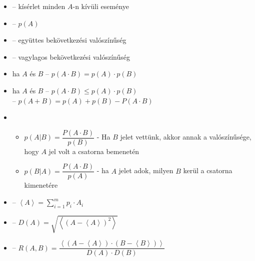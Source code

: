 \documentclass[main.tex]{subfiles}
\begin{document}
  \begin{itemize}
    \item {}
    – kísérlet minden $A$-n kívüli eseménye
    
    \item {}
    – $p(A)$
    
    \item {}
    – együttes bekövetkezési valószínűség
    
    \item {}
    – vagylagos bekövetkezési valószínűség
    
    \item ha $A$ és $B$ 
    – $p(A \cdot B) = p(A) \cdot p(B)$
    
    \item ha $A$ és $B$ 
    \tabto{3.8cm} – \tabto{4.4cm} $p(A \cdot B) \leq p(A) \cdot p(B)$ \\[1mm]
    \tabto{3.8cm} – \tabto{4.4cm} $p(A+B) = p(A) + p(B) - P(A \cdot B)$
    
    \item {}
    \begin{itemize}
      \item $p \left( A|B \right) = \dfrac{P(A \cdot B)}{p(B)}$
      \tabto{4cm} - \tabto{4.6cm}
      Ha $B$ jelet vettünk, akkor annak a valószínűsége,
      \\ \tabto{4.6cm}
      hogy $A$ jel volt a csatorna bemenetén
      \item $p \left( B|A \right) = \dfrac{P(A \cdot B)}{p(A)}$
      \tabto{4cm} - \tabto{4.6cm}
      ha $A$ jelet adok, milyen $B$ kerül a csatorna kimenetére
    \end{itemize}
    
    \item {} \hspace{.2em} – \hspace{.2em}
    $\left\langle A \right\rangle
    = \displaystyle \sum_{i=1}^m p_i \cdot A_i$

    \item {} \hspace{.2em} – \hspace{.2em}
    $D(A) = \displaystyle\sqrt{
      \left\langle \left(
        A - \left\langle A \right\rangle
      \right)^2\right\rangle
    }$

    \item {} \hspace{.2em} – \hspace{.2em}
    $R \left(A, B\right) = \dfrac{\left\langle
      (A - \left\langle A \right\rangle)
      \cdot (B - \left\langle B \right\rangle)
    \right\rangle}{
      D(A) \cdot D(B)
    }$

  \end{itemize}
  
\end{document}
